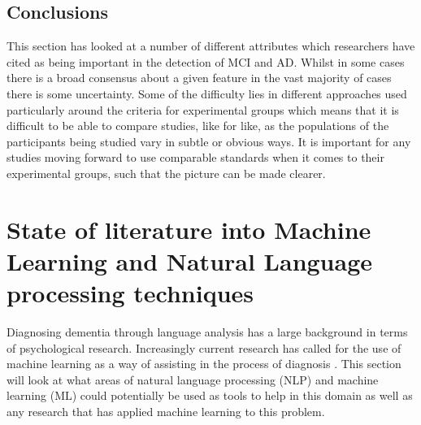 \subsection{Conclusions}
This section has looked at a number of different attributes which researchers have cited as being important in the detection of MCI and AD. Whilst in some cases there is a broad consensus about a given feature in the vast majority of cases there is some uncertainty. Some of the difficulty lies in different approaches used particularly around the criteria for experimental groups which means that it is difficult to be able to compare studies, like for like, as the populations of the participants being studied vary in subtle or obvious ways. It is important for any studies moving forward to use comparable standards when it comes to their experimental groups, such that the picture can be made clearer.

\section{State of literature into Machine Learning and Natural Language processing techniques}
Diagnosing dementia through language analysis has a large background in terms of psychological research. Increasingly current research has called for the use of machine learning as a way of assisting in the process of diagnosis \cite{Orimaye2017, Boschi2017}. This section will look at what areas of natural language processing (NLP) and machine learning (ML) could potentially be used as tools to help in this domain as well as any research that has applied machine learning to this problem.
